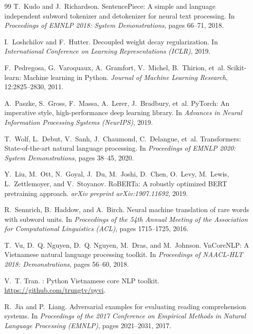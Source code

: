 {\begin{thebibliography}{99}
T.~Kudo and J.~Richardson.
\newblock SentencePiece: A simple and language independent subword tokenizer and detokenizer for neural text processing.
\newblock In \emph{Proceedings of EMNLP 2018: System Demonstrations}, pages 66--71, 2018.

I.~Loshchilov and F.~Hutter.
\newblock Decoupled weight decay regularization.
\newblock In \emph{International Conference on Learning Representations (ICLR)}, 2019.

F.~Pedregosa, G.~Varoquaux, A.~Gramfort, V.~Michel, B.~Thirion, et~al.
\newblock Scikit-learn: Machine learning in Python.
\newblock \emph{Journal of Machine Learning Research}, 12:2825--2830, 2011.

A.~Paszke, S.~Gross, F.~Massa, A.~Lerer, J.~Bradbury, et~al.
\newblock PyTorch: An imperative style, high-performance deep learning library.
\newblock In \emph{Advances in Neural Information Processing Systems (NeurIPS)}, 2019.

T.~Wolf, L.~Debut, V.~Sanh, J.~Chaumond, C.~Delangue, et~al.
\newblock Transformers: State-of-the-art natural language processing.
\newblock In \emph{Proceedings of EMNLP 2020: System Demonstrations}, pages 38--45, 2020.

Y.~Liu, M.~Ott, N.~Goyal, J.~Du, M.~Joshi, D.~Chen, O.~Levy, M.~Lewis, L.~Zettlemoyer, and V.~Stoyanov.
\newblock RoBERTa: A robustly optimized BERT pretraining approach.
\newblock \emph{arXiv preprint arXiv:1907.11692}, 2019.

R.~Sennrich, B.~Haddow, and A.~Birch.
\newblock Neural machine translation of rare words with subword units.
\newblock In \emph{Proceedings of the 54th Annual Meeting of the Association for Computational Linguistics (ACL)}, pages 1715--1725, 2016.

T.~Vu, D.~Q. Nguyen, D.~Q. Nguyen, M.~Dras, and M.~Johnson.
\newblock VnCoreNLP: A Vietnamese natural language processing toolkit.
\newblock In \emph{Proceedings of NAACL-HLT 2018: Demonstrations}, pages 56--60, 2018.

V.~T. Tran.
\newblock {}: Python Vietnamese core NLP toolkit.
\newblock \url{https://github.com/trungtv/pyvi}.

R.~Jia and P.~Liang.
\newblock Adversarial examples for evaluating reading comprehension systems.
\newblock In \emph{Proceedings of the 2017 Conference on Empirical Methods in Natural Language Processing (EMNLP)}, pages 2021--2031, 2017.


\end{thebibliography}}
